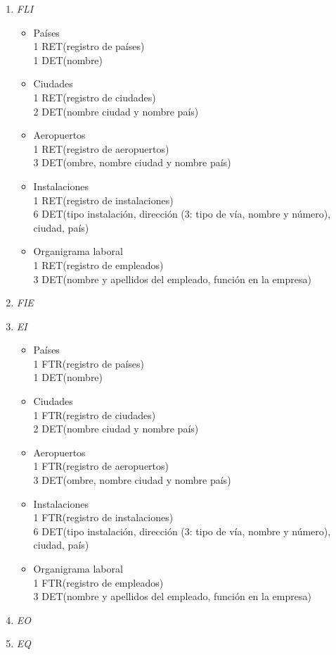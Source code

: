 \begin{enumerate}
	\item \textit{FLI}
		\begin{itemize}
			\item Países \\
			1 RET(registro de países) \\
			1 DET(nombre) \\
			\item Ciudades \\
			1 RET(registro de ciudades) \\
			2 DET(nombre ciudad y nombre país) \\
			\item Aeropuertos \\
			1 RET(registro de aeropuertos) \\
			3 DET(ombre, nombre ciudad y nombre país) \\
			\item Instalaciones \\
			1 RET(registro de instalaciones) \\
			6 DET(tipo instalación, dirección (3: tipo de vía, nombre y número), ciudad, país) \\
			\item Organigrama laboral \\
			1 RET(registro de empleados) \\
			3 DET(nombre y apellidos del empleado, función en la empresa) \\
		\end{itemize}
	\item \textit{FIE}
	\item \textit{EI}
		\begin{itemize}
			\item Países \\
			1 FTR(registro de países) \\
			1 DET(nombre) \\
			\item Ciudades \\
			1 FTR(registro de ciudades) \\
			2 DET(nombre ciudad y nombre país) \\
			\item Aeropuertos \\
			1 FTR(registro de aeropuertos) \\
			3 DET(ombre, nombre ciudad y nombre país) \\
			\item Instalaciones \\
			1 FTR(registro de instalaciones) \\
			6 DET(tipo instalación, dirección (3: tipo de vía, nombre y número), ciudad, país) \\
			\item Organigrama laboral \\
			1 FTR(registro de empleados) \\
			3 DET(nombre y apellidos del empleado, función en la empresa) \\
		\end{itemize}
	\item \textit{EO}
	\item \textit{EQ}
\end{enumerate}

